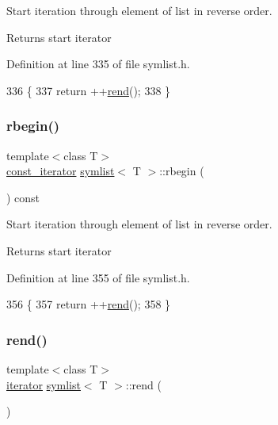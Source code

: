 Start iteration through element of list in reverse order. 

\begin{DoxyReturn}{Returns}
start iterator 
\end{DoxyReturn}


Definition at line 335 of file symlist.\+h.


\begin{DoxyCode}
336     \{
337     \textcolor{keywordflow}{return} ++\mbox{\hyperlink{classsymlist_a421fc482e62f257a9081e9e1c29d66a6}{rend}}();
338     \}
\end{DoxyCode}
\mbox{\label{classsymlist_a3779415d5588f9621494f40789841caf}} 
\subsubsection{\texorpdfstring{rbegin()}{rbegin()}\hspace{0.1cm}{\footnotesize\ttfamily [2/2]}}
{\footnotesize\ttfamily template$<$class T$>$ \\
\mbox{\hyperlink{classsymlist_af15c0ca931299054f83d17a1580a5159}{const\+\_\+iterator}} \mbox{\hyperlink{classsymlist}{symlist}}$<$ T $>$\+::rbegin (\begin{DoxyParamCaption}{ }\end{DoxyParamCaption}) const\hspace{0.3cm}{\ttfamily [inline]}}



Start iteration through element of list in reverse order. 

\begin{DoxyReturn}{Returns}
start iterator 
\end{DoxyReturn}


Definition at line 355 of file symlist.\+h.


\begin{DoxyCode}
356     \{
357     \textcolor{keywordflow}{return} ++\mbox{\hyperlink{classsymlist_a421fc482e62f257a9081e9e1c29d66a6}{rend}}();
358     \}
\end{DoxyCode}
\mbox{\label{classsymlist_a421fc482e62f257a9081e9e1c29d66a6}} 
\subsubsection{\texorpdfstring{rend()}{rend()}\hspace{0.1cm}{\footnotesize\ttfamily [1/2]}}
{\footnotesize\ttfamily template$<$class T$>$ \\
\mbox{\hyperlink{classsymlist_a66045fbe3d98975e5537092ede8b50df}{iterator}} \mbox{\hyperlink{classsymlist}{symlist}}$<$ T $>$\+::rend (\begin{DoxyParamCaption}{ }\end{DoxyParamCaption})\hspace{0.3cm}{\ttfamily [inline]}}



